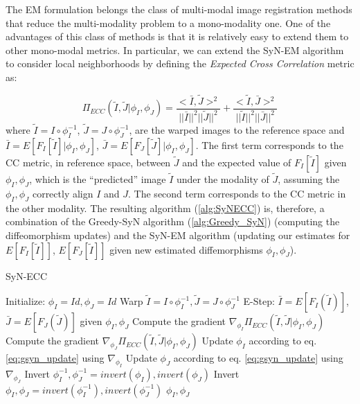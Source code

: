 The EM formulation belongs the class of multi-modal image registration methods that reduce the multi-modality problem to a mono-modality one\cite{Sotiras2013}. One of the
advantages of this class of methods is that it is relatively easy to extend them to other mono-modal metrics. In particular, we can extend the SyN-EM algorithm to consider
local neighborhoods by defining the {\it Expected Cross Correlation} metric as:

\begin{equation}\label{eq:ecc_metric}
    \Pi_{ECC}(\tilde{I}, \tilde{J} | \phi_{I}, \phi_{J}) = \frac{<\bar{I}, \tilde{J}>^{2}}{||\bar{I}||^{2}||\tilde{J}||^{2}} + \frac{<\tilde{I}, \bar{J}>^{2}}{||\tilde{I}||^{2}||\bar{J}||^{2}}
\end{equation}
where $\tilde{I} = I\circ \phi_{I}^{-1}$, $\tilde{J} = J\circ \phi_{J}^{-1}$, are the warped images to the reference space and
$\bar{I} = E[F_{I}[\tilde{I}]|\phi_{I}, \phi_{J}]$, $\bar{J} = E[F_{J}[\tilde{J}]|\phi_{I}, \phi_{J}]$. The first term corresponds to the CC metric, in reference space,
between $\tilde{J}$ and the expected value of $F_{I}[\tilde{I}]$ given $\phi_{I}, \phi_{J}$, which is the ``predicted'' image $\tilde{I}$ under the modality of $\tilde{J}$,
assuming the $\phi_{I}, \phi_{J}$ correctly align $I$ and $J$. The second term corresponds to the CC metric in the other modality. The resulting algorithm (\ref{alg:SyNECC})
is, therefore, a combination of the Greedy-SyN algorithm (\ref{alg:Greedy_SyN}) (computing the diffeomorphism updates) and the SyN-EM algorithm (updating our estimates
for $E[F_{I}[\tilde{I}]]$, $E[F_{J}[\tilde{I}]]$ given new estimated diffemorphisms $\phi_{I}, \phi_{J}$).

\begin{algorithm}[h!]
\caption{SyN-ECC}\label{alg:SyNECC}
\begin{algorithmic}[1]
\STATE Initialize: $\phi_{I} = Id, \phi_{J} = Id$
\REPEAT
    \STATE Warp $\tilde{I}  = I \circ \phi_{I}^{-1}, \tilde{J} = J \circ \phi_{J}^{-1}$
    \STATE E-Step: $\bar{I} = E[F_{I}(\tilde{I})]$, $\bar{J} = E[F_{J}(\tilde{J})]$ given $\phi_{I}, \phi_{J}$
    \STATE Compute the gradient $\nabla_{\phi_{I}} \Pi_{ECC}(\tilde{I}, \tilde{J} | \phi_{I}, \phi_{J})$
    \STATE Compute the gradient $\nabla_{\phi_{J}} \Pi_{ECC}(\tilde{I}, \tilde{J} | \phi_{I}, \phi_{J})$
    \STATE Update $\phi_{I}$ according to eq. \ref{eq:gsyn_update} using $\nabla_{\phi_{I}}$
    \STATE Update $\phi_{J}$ according to eq. \ref{eq:gsyn_update} using $\nabla_{\phi_{J}}$
    \STATE Invert $\phi_{I}^{-1}, \phi_{J}^{-1} = invert(\phi_{I}), invert(\phi_{J})$
    \STATE Invert $\phi_{I}, \phi_{J} = invert(\phi_{I}^{-1}), invert(\phi_{J}^{-1})$
\RETURN $\phi_{I}, \phi_{J}$
\end{algorithmic}
\end{algorithm}
